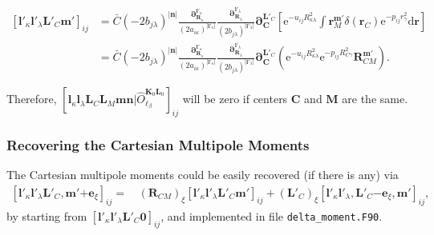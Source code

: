 \documentclass[a4paper,11pt,twoside,openright]{book}
\begin{document}
\begin{align}
  \left[\boldsymbol{l}'_{\kappa}\boldsymbol{l}'_{\lambda}\boldsymbol{L}'_{C}\boldsymbol{m}'\right]_{ij}
  &=\bar{C}(-2b_{j\lambda})^{|\boldsymbol{n}|}%
    \frac{\boldsymbol{\partial}_{\boldsymbol{R}_{\kappa}}^{\boldsymbol{l}'_{\kappa}}}%
      {(2a_{i\kappa})^{|\boldsymbol{l}'_{\kappa}|}}%
    \frac{\boldsymbol{\partial}_{\boldsymbol{R}_{\lambda}}^{\boldsymbol{l}'_{\lambda}}}%
      {(2b_{j\lambda})^{|\boldsymbol{l}'_{\lambda}|}}%
    \boldsymbol{\partial}_{\boldsymbol{C}}^{\boldsymbol{L}'_{C}}%
    \left[\mathrm{e}^{-u_{ij}R_{\kappa\lambda}^2}\int%
      \boldsymbol{r}_{M}^{\boldsymbol{m}'}\delta(\boldsymbol{r}_{C})%
        \mathrm{e}^{-p_{ij}r_{\gamma}^2}\mathrm{d}\boldsymbol{r}\right]\\
  &=\bar{C}(-2b_{j\lambda})^{|\boldsymbol{n}|}%
    \frac{\boldsymbol{\partial}_{\boldsymbol{R}_{\kappa}}^{\boldsymbol{l}'_{\kappa}}}%
      {(2a_{i\kappa})^{|\boldsymbol{l}'_{\kappa}|}}%
    \frac{\boldsymbol{\partial}_{\boldsymbol{R}_{\lambda}}^{\boldsymbol{l}'_{\lambda}}}%
      {(2b_{j\lambda})^{|\boldsymbol{l}'_{\lambda}|}}%
    \boldsymbol{\partial}_{\boldsymbol{C}}^{\boldsymbol{L}'_{C}}%
    \left(\mathrm{e}^{-u_{ij}R_{\kappa\lambda}^2}\mathrm{e}^{-p_{ij}R_{C\gamma}^2}%
    \boldsymbol{R}_{CM}^{\boldsymbol{m}'}\right).\nonumber
\end{align}

Therefore, $\left[\boldsymbol{l}_{\kappa}\boldsymbol{l}_{\lambda}\boldsymbol{L}_{C}%
\boldsymbol{L}_{M}\boldsymbol{m}\boldsymbol{n}\Big|%
\hat{O}_{\ell_{\beta}}^{\boldsymbol{K}_{0}\boldsymbol{L}_{0}}\right]_{ij}$
will be zero if centers $\boldsymbol{C}$ and $\boldsymbol{M}$ are the same.

\subsubsection{Recovering the Cartesian Multipole Moments}

The Cartesian multipole moments could be easily recovered (if there is any) via~\cite{Gao:IJQC:2010}
\begin{align}
  \label{eq:delta-multipole-order}
  \left[\boldsymbol{l}'_{\kappa}\boldsymbol{l}'_{\lambda}\boldsymbol{L}'_{C},%
    \boldsymbol{m}'\mathrm{+}\boldsymbol{e}_{\xi}\right]_{ij}
  =\,&(\boldsymbol{R}_{CM})_{\xi}%
      \left[\boldsymbol{l}'_{\kappa}\boldsymbol{l}'_{\lambda}\boldsymbol{L}'_{C}\boldsymbol{m}'\right]_{ij}
  +(\boldsymbol{L}'_{C})_{\xi}%
    \left[\boldsymbol{l}'_{\kappa}\boldsymbol{l}'_{\lambda},%
      \boldsymbol{L}'_{C}\mathrm{-}\boldsymbol{e}_{\xi},\boldsymbol{m}'\right]_{ij},
\end{align}
by starting from $\left[\boldsymbol{l}'_{\kappa}\boldsymbol{l}'_{\lambda}\boldsymbol{L}'_{C}\boldsymbol{0}\right]_{ij}$,
and implemented in file \verb|delta_moment.F90|.
\end{document}
